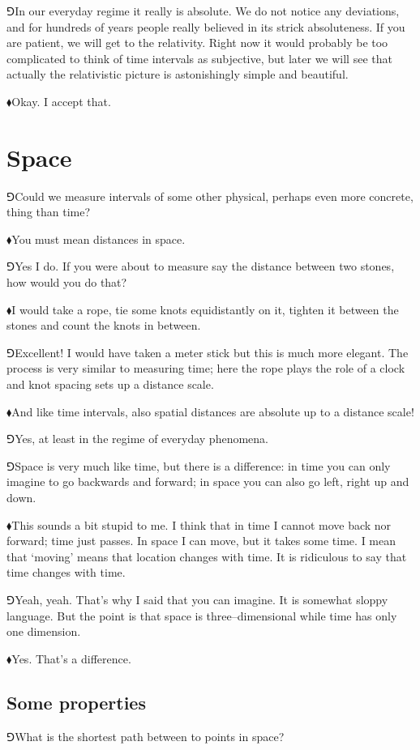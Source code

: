 \documentclass[10pt,oneside%
]{memoir}
\newcommand{\hea}{\(\blacklozenge\)\;}
\newcommand{\heb}{\(\Game\)\;}
\begin{document}
\heb In our everyday regime it really is absolute. We do not notice any deviations, and for hundreds of years people really believed in its strick absoluteness. If you are patient, we will get to the relativity. Right now it would probably be too complicated to think of time intervals as subjective, but later we will see that actually the relativistic picture is astonishingly simple and beautiful.

\hea Okay. I accept that.
\section{Space}
\heb Could we measure intervals of some other physical, perhaps even more concrete, thing than time?

\hea You must mean distances in space.

\heb Yes I do. If you were about to measure say the distance between two stones, how would you do that?

\hea I would take a rope, tie some knots equidistantly on it, tighten it between the stones and count the knots in between.

\heb Excellent! I would have taken a meter stick but this is much more elegant. The process is very similar to measuring time; here the rope plays the role of a clock and knot spacing sets up a distance scale.

\hea And like time intervals, also spatial distances are absolute up to a distance scale!

\heb Yes, at least in the regime of everyday phenomena.

\heb Space is very much like time, but there is a difference: in time you can only imagine to go backwards and forward; in space you can also go left, right up and down.

\hea This sounds a bit stupid to me. I think that in time I cannot move back nor forward; time just passes. In space I can move, but it takes some time. I mean that `moving' means that location changes with time. It is ridiculous to say that time changes with time.

\heb Yeah, yeah. That's why I said that you can imagine. It is somewhat sloppy language. But the point is that space is three--dimensional while time has only one dimension.

\hea Yes. That's a difference.
\subsection{Some properties}
\heb What is the shortest path between to points in space?
\end{document}
